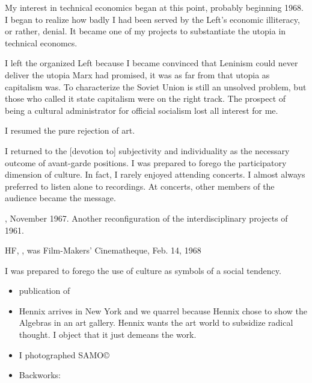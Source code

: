 My interest in technical economics began at this point, probably beginning 1968.  I began to realize how badly I had been served by the Left's economic illiteracy, or rather, denial.  It became one of my projects to substantiate the utopia in technical economcs.

I left the organized Left because I became convinced that Leninism could never deliver the utopia Marx had promised, it was as far from that utopia as capitalism was.  To characterize the Soviet Union is still an unsolved problem, but those who called it state capitalism were on the right track.  The prospect of being a cultural administrator for official socialism lost all interest for me. 

I resumed the pure rejection of art.

I returned to the [devotion to] subjectivity and individuality as the necessary  outcome of avant-garde positions.  I was prepared to forego the participatory dimension of culture.  In fact, I rarely enjoyed attending concerts.  I almost always preferred to listen alone to recordings.  At concerts, other members of the audience became the message.

, November 1967.  Another reconfiguration of the interdisciplinary projects of 1961.

HF, , was Film-Makers' Cinematheque, Feb. 14, 1968

I was prepared to forego the use of culture as symbols of a social tendency.

\Pb

\begin{itemize}
\item {} publication of 

\item {} Hennix arrives in New York and we quarrel because Hennix chose to show the Algebras in an art gallery.  Hennix wants the art world to subsidize radical thought.  I object that it just demeans the work.

\item {} I photographed SAMO©

\item {} Backworks: 
\end{itemize}

